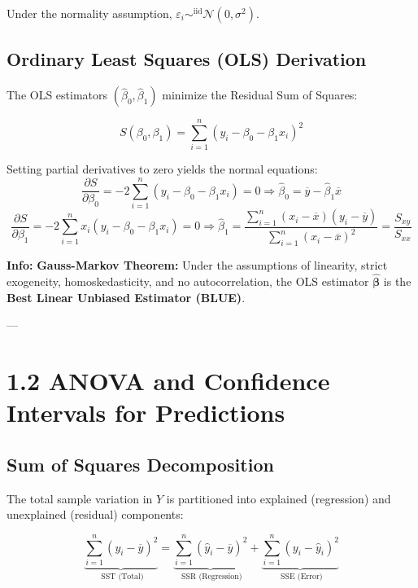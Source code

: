 \documentclass[
]{article}
\begin{document}
Under the normality assumption,
\(\varepsilon_{i} \sim^{\text{iid}}\mathcal{N}(0,\sigma^{2})\).

\textbf{ }

\subsection{Ordinary Least Squares (OLS) Derivation}

The OLS estimators
\(\left( {\hat{\beta}}_{0},{\hat{\beta}}_{1} \right)\) minimize the
Residual Sum of Squares:

\[S\left( \beta_{0},\beta_{1} \right) = \sum_{i = 1}^{n}\left( y_{i} - \beta_{0} - \beta_{1}x_{i} \right)^{2}\]

Setting partial derivatives to zero yields the normal equations:
\[\frac{\partial S}{\partial\beta_{0}} = - 2\sum_{i = 1}^{n}\left( y_{i} - \beta_{0} - \beta_{1}x_{i} \right) = 0 \Longrightarrow {\hat{\beta}}_{0} = \overline{y} - {\hat{\beta}}_{1}\overline{x}\]
\[\frac{\partial S}{\partial\beta_{1}} = - 2\sum_{i = 1}^{n}x_{i}\left( y_{i} - \beta_{0} - \beta_{1}x_{i} \right) = 0 \Longrightarrow {\hat{\beta}}_{1} = \frac{\sum_{i = 1}^{n}\left( x_{i} - \overline{x} \right)\left( y_{i} - \overline{y} \right)}{\sum_{i = 1}^{n}\left( x_{i} - \overline{x} \right)^{2}} = \frac{S_{xy}}{S_{xx}}\]

\textbf{Info: } \textbf{Gauss-Markov Theorem:} Under the assumptions of
linearity, strict exogeneity, homoskedasticity, and no autocorrelation,
the OLS estimator \(\hat{\mathbf{\beta}}\) is the \textbf{Best Linear
Unbiased Estimator (BLUE)}.

---

\textbf{ }

\section{1.2 ANOVA and Confidence Intervals for Predictions}

\textbf{ }

\subsection{Sum of Squares Decomposition}

The total sample variation in \(Y\) is partitioned into explained
(regression) and unexplained (residual) components:

\[\underset{\text{ SST (Total)}}{\underbrace{\sum_{i = 1}^{n}\left( y_{i} - \overline{y} \right)^{2}}} = \underset{\text{ SSR (Regression)}}{\underbrace{\sum_{i = 1}^{n}\left( {\hat{y}}_{i} - \overline{y} \right)^{2}}} + \underset{\text{ SSE (Error)}}{\underbrace{\sum_{i = 1}^{n}\left( y_{i} - {\hat{y}}_{i} \right)^{2}}}\]
\end{document}
